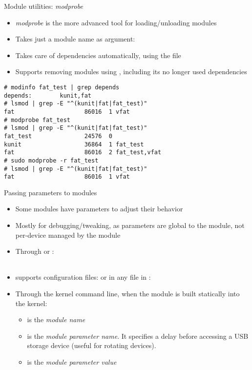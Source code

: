\begin{frame}[fragile]{Module utilities: {\em modprobe}}
  \begin{itemize}
  \item {\em modprobe} is the more advanced tool for loading/unloading
    modules
  \item Takes just a module name as argument: 
  \item Takes care of dependencies automatically, using the
     file
  \item Supports removing modules using , including
    its no longer used dependencies
  \end{itemize}

  \begin{block}{}
    {\footnotesize
\begin{verbatim}
# modinfo fat_test | grep depends
depends:        kunit,fat
# lsmod | grep -E "^(kunit|fat|fat_test)"
fat                    86016  1 vfat
# modprobe fat_test
# lsmod | grep -E "^(kunit|fat|fat_test)"
fat_test               24576  0
kunit                  36864  1 fat_test
fat                    86016  2 fat_test,vfat
# sudo modprobe -r fat_test
# lsmod | grep -E "^(kunit|fat|fat_test)"
fat                    86016  1 vfat
\end{verbatim}
    }
  \end{block}
\end{frame}

\begin{frame}{Passing parameters to modules}
  \small
  \begin{itemize}
  \item Some modules have parameters to adjust their behavior
  \item Mostly for debugging/tweaking, as parameters are global to the
    module, not per-device managed by the module
  \item Through  or :\\
    \\
  \item {} supports configuration files:  or in any file in :\\
  \item Through the kernel command line, when the module is built statically into the kernel:\\
    \begin{itemize}
    \item {} is the {\em module name}
    \item {} is the {\em module parameter name}. It
      specifies a delay before accessing a USB storage device (useful for
      rotating devices).
    \item {} is the {\em module parameter value}
    \end{itemize}
  \end{itemize}
\end{frame}


